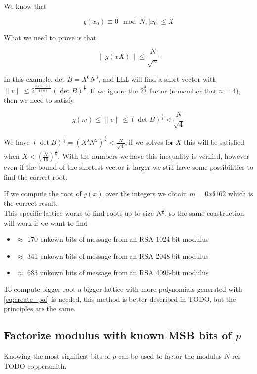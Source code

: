 \documentclass[a4paper,12pt]{report}
\begin{document}
We know that

\[
    g(x_0) \equiv 0 \mod N, |x_0| \le X
\]

What we need to prove is that

\[
    \lVert g(xX) \rVert \le \frac{N}{\sqrt{n}}
\] 

In this example, det $B = X^6N^3$, and LLL will find a short vector with $\lVert v \rVert \le 2^{\frac{n(n-1)}{4(n)}} (\det B)^{\frac{1}{n}}$.
If we ignore the $2^{\frac{3}{4}}$ factor (remember that $n = 4$), then we need to satisfy

\[
    g(m) \le \lVert v \rVert \le (\det B)^{\frac{1}{4}} < \frac{N}{\sqrt{4}}
\] 

\vspace*{10px}

We have $(\det B)^{\frac{1}{4}} = (X^6N^3)^{\frac{1}{4}} < \frac{N}{\sqrt{4}}$, if we solves for $X$ this will be satisfied when $X < (\frac{N}{16})^{\frac{1}{6}}$.
With the numbers we have this inequality is verified, however even if the bound of the shortest vector is larger we still have some possibilities to
find the correct root.

If we compute the root of $g(x)$ over the integers we obtain $m = 0x6162$ which is the correct result.\\

This specific lattice works to find roots up to size $N^{\frac{1}{6}}$, so the same construction will work if we want to find

\begin{itemize}
    \item $\approx$ 170 unkown bits of message from an RSA 1024-bit modulus
    \item $\approx$ 341 unkown bits of message from an RSA 2048-bit modulus
    \item $\approx$ 683 unkown bits of message from an RSA 4096-bit modulus
\end{itemize}

To compute bigger root a bigger lattice with more polynomials generated with \ref{eq:create_pol} is needed,
this method is better described in TODO, but the principles are the same.

\subsection{Factorize modulus with known MSB bits of $p$}

Knowing the most significat bits of $p$ can be used to factor the modulus $N$ ref TODO coppersmith.
\end{document}
